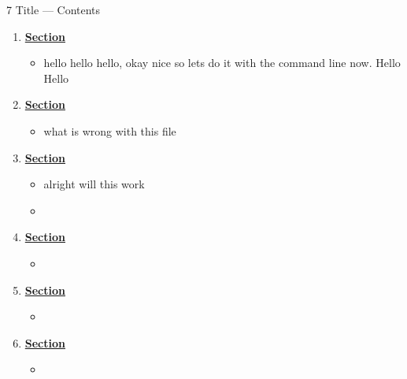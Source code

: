 \documentclass[12pt,letterpaper]{article}
\begin{document}
\setcounter{section}{7} %
\begin{chapbox}{7 Title --- Contents}{ 
\begin{enumerate}[font=\bfseries, wide]
\item \hyperlink{7.1}{\textbf{Section}}
    \begin{itemize}
        \item hello hello hello, okay nice so lets do it with the command line now. Hello Hello
    \end{itemize}
    \item \hyperlink{7.2}{\textbf{Section}}
    \begin{itemize}
        \item what is wrong with this file
    \end{itemize}
\item \hyperlink{7.3}{\textbf{Section}}
    \begin{itemize}
        \item alright will this work
        \item 
    \end{itemize}
\item \hyperlink{7.4}{\textbf{Section}}
    \begin{itemize}
        \item 
    \end{itemize}
\item \hyperlink{7.5}{\textbf{Section}}
    \begin{itemize}
        \item 
    \end{itemize}
\item \hyperlink{7.6}{\textbf{Section}}
    \begin{itemize}
        \item 
    \end{itemize}
\end{enumerate}
}\end{chapbox}
\end{document}

